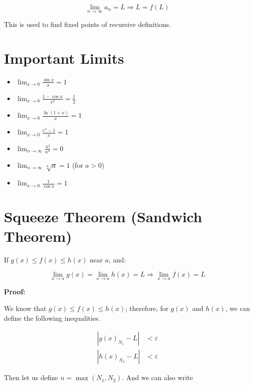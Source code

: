 \[
    \lim_{n \to \infty} a_n = L \Rightarrow L = f(L)
\]

This is used to find fixed points of recursive definitions.

\section{Important Limits}

\begin{itemize}

    \item \( \lim_{x \to 0} \frac{\sin x}{x} = 1\)

    \item \( \lim_{x \to 0} \frac{1 - \cos x}{x^2} = \frac{1}{2}\)

    \item \( \lim_{x \to 0} \frac{\ln(1 + x)}{x} = 1\)

    \item \( \lim_{x \to 0} \frac{e^x - 1}{x} = 1\)

    \item \( \lim_{n \to \infty} \frac{n!}{n^n} = 0\)

    \item \( \lim_{n \to \infty} \sqrt[n]{a} = 1\) (for \(a > 0\))

    \item \( \lim_{x \to 0} \frac{1}{\cos x} = 1\)

\end{itemize}

\section{Squeeze Theorem (Sandwich Theorem)}

If \(g(x) \le f(x) \le h(x)\) near \(a\), and:

\[
    \lim_{x \to a} g(x) = \lim_{x \to a} h(x) = L
    \Rightarrow \lim_{x \to a} f(x) = L
\]

\textbf{Proof:}

We know that \(g(x) \le f(x) \le h(x)\); therefore, for \(g(x)\) and \(h(x)\), we 
can define the following inequalities. 

\begin{align*}
    |g(x)_{N_1} - L| &< \varepsilon \\ 
    |h(x)_{N_2} - L| &< \varepsilon 
\end{align*}

Then let us define \(n = \operatorname{max}(N_1, N_2)\). And we can also write 

